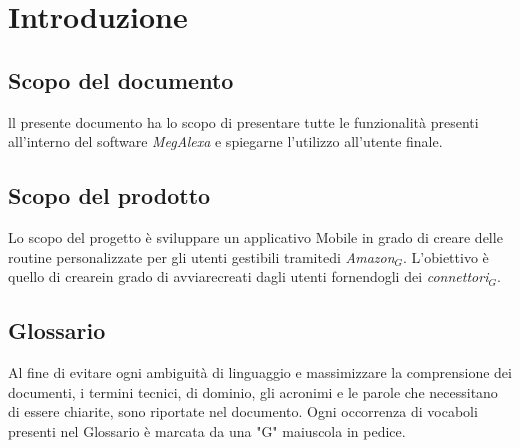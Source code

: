 \chapter{Introduzione}
\label{Introduzione}

\section{Scopo del documento}
ll presente documento ha lo scopo di presentare tutte le funzionalità presenti all'interno del software \textit{MegAlexa} e spiegarne l'utilizzo all'utente finale.

\section{Scopo del prodotto}
Lo scopo del progetto è sviluppare un applicativo Mobile in grado di creare delle routine personalizzate per gli utenti gestibili tramitedi \textit{Amazon$_{G}$}. L’obiettivo è quello di crearein grado di avviarecreati dagli utenti fornendogli dei \textit{connettori$_{G}$}.


\section{Glossario}
Al fine di evitare ogni ambiguità di linguaggio e massimizzare la comprensione dei documenti, i termini tecnici, di dominio, gli acronimi e le parole che necessitano di essere chiarite, sono riportate nel documento.
Ogni occorrenza di vocaboli presenti nel Glossario è marcata da una "G" maiuscola in pedice.
